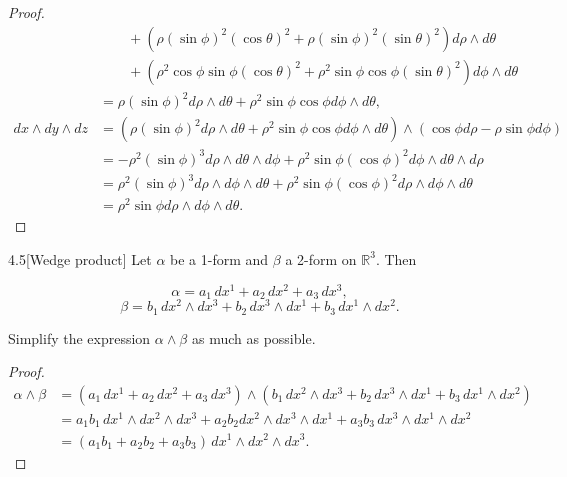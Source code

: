 \begin{proof}
\begin{align*}
		                       & \qquad + (\rho{(\sin\phi)}^{2}{(\cos\theta)}^{2} + \rho{(\sin\phi)}^{2}{(\sin\theta)}^{2}) d\rho \wedge d\theta                                                                                                        \\
		                       & \qquad + (\rho^{2}\cos\phi\sin\phi{(\cos\theta)}^{2} + \rho^{2}\sin\phi\cos\phi{(\sin\theta)}^{2}) d\phi \wedge d\theta                                                                                                \\
		                       & = \rho {(\sin\phi)}^{2} d\rho \wedge d\theta + \rho^{2}\sin\phi\cos\phi d\phi \wedge d\theta,                                                                                                                          \\
		dx \wedge dy \wedge dz & = (\rho {(\sin\phi)}^{2} d\rho \wedge d\theta + \rho^{2}\sin\phi\cos\phi d\phi \wedge d\theta) \wedge (\cos\phi d\rho - \rho\sin\phi d\phi)                                                                            \\
		                       & = -\rho^{2}{(\sin\phi)}^{3}d\rho \wedge d\theta \wedge d\phi + \rho^{2}\sin\phi{(\cos\phi)}^{2} d\phi \wedge d\theta \wedge d\rho                                                                                      \\
		                       & = \rho^{2}{(\sin\phi)}^{3} d\rho \wedge d\phi \wedge d\theta + \rho^{2}\sin\phi {(\cos\phi)}^{2}d\rho \wedge d\phi \wedge d\theta                                                                                      \\
		                       & = \rho^{2} \sin\phi d\rho \wedge d\phi \wedge d\theta.
	\end{align*}
	\endgroup
\end{proof}

\begin{problem}{4.5}[Wedge product]
Let \(\alpha\) be a 1-form and \(\beta\) a 2-form on \(\mathbb{R}^{3}\). Then

\[
	\alpha = a_{1}\,dx^{1} + a_{2}\,dx^{2} + a_{3}\,dx^{3},
\]
\[
	\beta = b_{1}\,dx^{2} \wedge dx^{3} + b_{2}\,dx^{3} \wedge dx^{1} + b_{3}\,dx^{1} \wedge dx^{2}.
\]

Simplify the expression \(\alpha \wedge \beta\) as much as possible.
\end{problem}

\begin{proof}
	\begingroup
	\allowdisplaybreaks%
	\begin{align*}
		\alpha \wedge \beta & = (a_{1}\,dx^{1} + a_{2}\,dx^{2} + a_{3}\,dx^{3}) \wedge (b_{1}\,dx^{2} \wedge dx^{3} + b_{2}\,dx^{3} \wedge dx^{1} + b_{3}\,dx^{1} \wedge dx^{2})  \\
		                    & = a_{1}b_{1}\, dx^{1} \wedge dx^{2} \wedge dx^{3} + a_{2}b_{2} dx^{2} \wedge dx^{3} \wedge dx^{1} + a_{3}b_{3}\, dx^{3} \wedge dx^{1} \wedge dx^{2} \\
		                    & = (a_{1}b_{1} + a_{2}b_{2} + a_{3}b_{3})\, dx^{1} \wedge dx^{2} \wedge dx^{3}.
	\end{align*}
	\endgroup
\end{proof}

